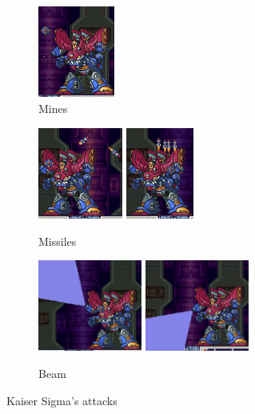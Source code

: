 \begin{figure}[htp]
	\centering
	\begin{subfigure}{.3\linewidth}
		\centering
		\includegraphics[height=3cm]{figures/X3/Doppler_stages/kaiser_mine.jpg}
		\caption{Mines}
	\end{subfigure}
	\begin{subfigure}{.4\linewidth}
		\centering
		\includegraphics[height=3cm]{figures/X3/Doppler_stages/kaiser_missile_1.jpg}
		\includegraphics[height=3cm]{figures/X3/Doppler_stages/kaiser_missile_2.jpg}
		\caption{Missiles}
	\end{subfigure}

	\begin{subfigure}{\linewidth} 
		\centering
		\includegraphics[height=3cm]{figures/X3/Doppler_stages/kaiser_beam_1.jpg}
		\includegraphics[height=3cm]{figures/X3/Doppler_stages/kaiser_beam_2.jpg}
		\caption{Beam}
	\end{subfigure}
	\caption{Kaiser Sigma's attacks}
\end{figure}

